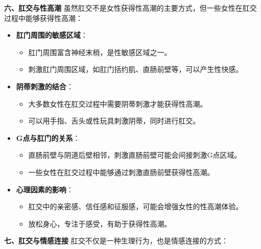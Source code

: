 \documentclass[12pt,UTF8]{ctexbook}
\begin{document}
\textbf{六、肛交与性高潮}
虽然肛交不是女性获得性高潮的主要方式，但一些女性在肛交过程中能够获得性高潮：

\begin{itemize}
	\item \textbf{肛门周围的敏感区域}：
	\begin{itemize}
		\item 肛门周围富含神经末梢，是性敏感区域之一。
		\item 刺激肛门周围区域，如肛门括约肌、直肠前壁等，可以产生性快感。
	\end{itemize}
	\item \textbf{阴蒂刺激的结合}：
	\begin{itemize}
		\item 大多数女性在肛交过程中需要阴蒂刺激才能获得性高潮。
		\item 可以用手指、舌头或性玩具刺激阴蒂，同时进行肛交。
	\end{itemize}
	\item \textbf{G点与肛门的关系}：
	\begin{itemize}
		\item 直肠前壁与阴道后壁相邻，刺激直肠前壁可能会间接刺激G点区域。
		\item 一些女性在肛交过程中能够通过刺激直肠前壁获得性高潮。
	\end{itemize}
	\item \textbf{心理因素的影响}：
	\begin{itemize}
		\item 肛交中的亲密感、信任感和征服感，可能会增强女性的性高潮体验。
		\item 放松身心，专注于感受，有助于获得性高潮。
	\end{itemize}
\end{itemize}

\textbf{七、肛交与情感连接}
肛交不仅是一种生理行为，也是情感连接的方式：
\end{document}
